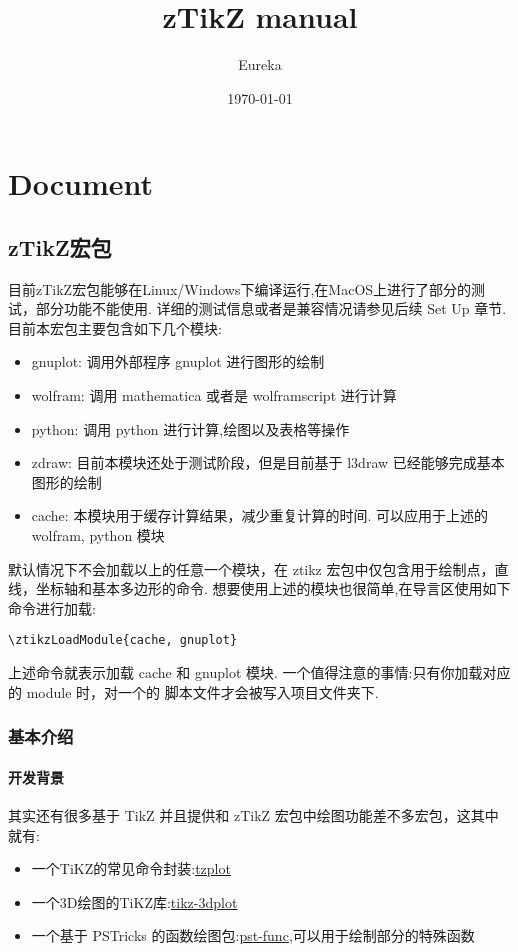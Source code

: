 \documentclass[
  hyper,    
  lang=cn,
  class=book,
  bib_index={load},
  mathSpec={envStyle=leftbar, alias},
  toc={column=2, title=目录},
]{zlatex}
\title{zTikZ manual}
\author{Eureka}
\date{\today}
\begin{document}
\maketitle
\frontmatter
\tableofcontents
\mainmatter
\part{Document}
\chapter{zTikZ{}宏包}\label{start-use-package}
目前zTikZ宏包能够在Linux/Windows下编译运行,在MacOS上进行了部分的测试，部分功能不能使用.
详细的测试信息或者是兼容情况请参见后续 Set Up 章节. 目前本宏包主要包含如下几个模块:

\begin{itemize}
  \item gnuplot: 调用外部程序 gnuplot 进行图形的绘制
  \item wolfram: 调用 mathematica 或者是 wolframscript 进行计算
  \item python: 调用 python 进行计算,绘图以及表格等操作
  \item zdraw: 目前本模块还处于测试阶段，但是目前基于 l3draw 已经能够完成基本图形的绘制
  \item cache: 本模块用于缓存计算结果，减少重复计算的时间. 可以应用于上述的 wolfram, python 模块
\end{itemize}

默认情况下不会加载以上的任意一个模块，在 ztikz 宏包中仅包含用于绘制点，直线，坐标轴和基本多边形的命令.
想要使用上述的模块也很简单,在导言区使用如下命令进行加载:
\begin{verbatim}
\ztikzLoadModule{cache, gnuplot}
\end{verbatim}

上述命令就表示加载 cache 和 gnuplot 模块. 一个值得注意的事情:只有你加载对应的 module 时，对一个的
脚本文件才会被写入项目文件夹下.

\section{基本介绍}
\subsection{开发背景}
其实还有很多基于 TikZ 并且提供和 zTikZ 宏包中绘图功能差不多宏包，这其中就有:
\begin{itemize}
    \item 一个TiKZ的常见命令封装:\href{https://ctan.org/tex-archive/graphics/pgf/contrib/tzplot}{tzplot}
    \item 一个3D绘图的TiKZ库:\href{https://ctan.org/pkg/tikz-3dplot}{tikz-3dplot}
    \item 一个基于 PSTricks 的函数绘图包:\href{https://ctan.org/pkg/pst-func}{pst-func},可以用于绘制部分的特殊函数
\end{itemize}
\end{document}

